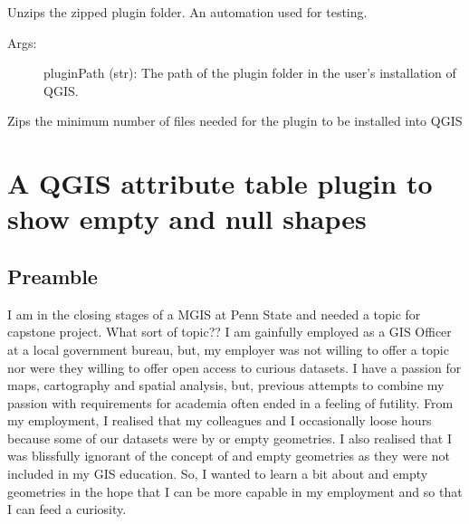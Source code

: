 \documentclass[letterpaper,10pt,english]{sphinxmanual}
\begin{document}
\begin{fulllineitems}
\label{\detokenize{API:zipGeomAttribute.installGeomAttributeFromZip}}
Unzips the zipped plugin folder.  An automation used for testing.
\begin{description}
\item[{Args:}] \leavevmode
pluginPath (str): The path of the plugin folder in the user’s installation of QGIS.

\end{description}

\end{fulllineitems}


\begin{fulllineitems}
\label{\detokenize{API:zipGeomAttribute.zipGeomAttribute}}
Zips the minimum number of files needed for the plugin to be installed into QGIS

\end{fulllineitems}



\chapter{A QGIS attribute table plugin to show empty and null shapes}
\label{\detokenize{concept:a-qgis-attribute-table-plugin-to-show-empty-and-null-shapes}}\label{\detokenize{concept:concept-page}}\label{\detokenize{concept::doc}}


\section{Preamble}
\label{\detokenize{concept:preamble}}
I am in the closing stages of a MGIS at Penn State and needed a topic for capstone project.  What sort of topic?? I am gainfully employed as a GIS Officer at a local government bureau, but, my employer was not willing to offer a topic nor were they willing to offer open access to curious datasets.  I have a passion for maps, cartography and spatial analysis, but, previous attempts to combine my passion with requirements for academia often ended in a feeling of futility.  From my employment, I realised that my colleagues and I occasionally loose hours because some of our datasets were  by  or empty geometries.  I also realised that I was blissfully ignorant of the concept of  and empty geometries as they were not included in my GIS education.  So, I wanted to learn a bit about  and empty geometries in the hope that I can be more capable in my employment and so that I can feed a curiosity.
\end{document}
